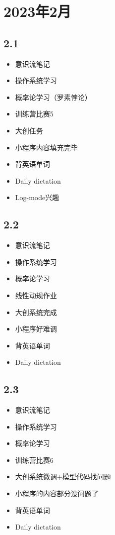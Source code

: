 \documentclass[UTF8]{ctexart}
\begin{document}
\section*{2023年2月}
\subsection*{2.1}
\begin{itemize}
    \item 意识流笔记
    \item 操作系统学习
    \item 概率论学习（罗素悖论）
    \item 训练营比赛5
    \item 大创任务
    \item 小程序内容填充完毕
    \item 背英语单词
    \item Daily dictation
    \item Log-mode兴趣
\end{itemize}
\subsection*{2.2}
\begin{itemize}
    \item 意识流笔记
    \item 操作系统学习
    \item 概率论学习
    \item 线性动规作业
    \item 大创系统完成
    \item 小程序好难调
    \item 背英语单词
    \item Daily dictation
\end{itemize}
\subsection*{2.3}
\begin{itemize}
    \item 意识流笔记
    \item 操作系统学习
    \item 概率论学习
    \item 训练营比赛6
    \item 大创系统微调+模型代码找问题
    \item 小程序的内容部分没问题了
    \item 背英语单词
    \item Daily dictation
\end{itemize}
\end{document}
